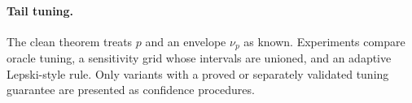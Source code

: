 \paragraph{Tail tuning.}
The clean theorem treats $p$ and an envelope $\nu_p$ as known. Experiments compare oracle tuning, a sensitivity grid whose intervals are unioned, and an adaptive Lepski-style rule. Only variants with a proved or separately validated tuning guarantee are presented as confidence procedures.
